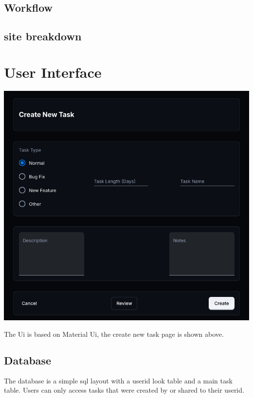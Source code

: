 \documentclass{article}
\begin{document}
\subsection{Workflow}


\subsection{site breakdown}

 
\section{User Interface}

\includegraphics[width=0.9\linewidth]{./logo/mockup.png} 

The Ui is based on Material Ui\cite{mui}, the create new task page is shown above.

\subsection{Database}
The database is a simple \Gls{sql} layout with a userid look table and a main task table. Users can only access tasks that were created by or shared to their userid.


\pagebreak
\printglossaries

\printbibliography
\end{document}
